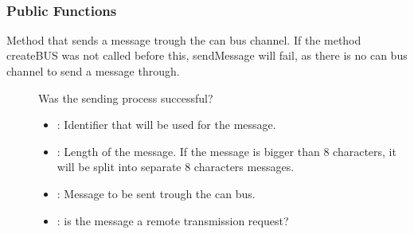 \documentclass[a4paper,10pt,english]{sphinxmanual}
\begin{document}
\begin{fulllineitems}
\label{\detokenize{classestracing:_CPPv49STCanScan}}%
\pysigstartmultiline
{}%
\pysigstopmultiline~\subsubsection*{Public Functions}

\begin{fulllineitems}
\label{\detokenize{classestracing:_CPPv4N9STCanScan11sendMessageEshPhb}}%
\pysigstartmultiline
{}%
\pysigstopmultiline
Method that sends a message trough the can bus channel. If the method createBUS was not called before this, sendMessage will fail, as there is no can bus channel to send a message through.

\begin{description}
\item[{}] \leavevmode
Was the sending process successful? 

\item[{}] \leavevmode\begin{itemize}
\item {} 
: Identifier that will be used for the message. 

\item {} 
: Length of the message. If the message is bigger than 8 characters, it will be split into separate 8 characters messages. 

\item {} 
: Message to be sent trough the can bus. 

\item {} 
: is the message a remote transmission request? 


\end{itemize}
\end{description}
\end{fulllineitems}
\end{fulllineitems}
\end{document}
